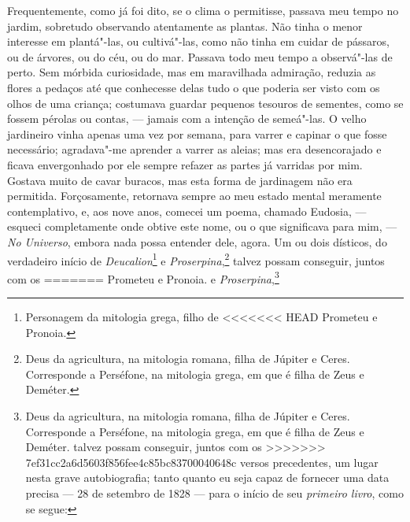 {{{{{{{{{{{{{{{{{%
Frequentemente, como já foi dito, se o clima o permitisse, passava
meu tempo no jardim, sobretudo observando atentamente as plantas. Não
tinha o menor interesse em plantá"-las, ou cultivá"-las, como não tinha em
cuidar de pássaros, ou de árvores, ou do céu, ou do mar. Passava todo
meu tempo a observá"-las de perto. Sem mórbida curiosidade, mas em
maravilhada admiração, reduzia as flores a pedaços até que conhecesse
delas tudo o que poderia ser visto com os olhos de uma criança;
costumava guardar pequenos tesouros de sementes, como se fossem pérolas
ou contas, --- jamais com a intenção de semeá"-las. O velho jardineiro
vinha apenas uma vez por semana, para varrer e capinar o que fosse
necessário; agradava"-me aprender a varrer as aleias; mas era
desencorajado e ficava envergonhado por ele sempre refazer as partes já
varridas por mim. Gostava muito de cavar buracos, mas esta forma de
jardinagem não era permitida. Forçosamente, retornava sempre ao meu
estado mental meramente contemplativo, e, aos nove anos, comecei um
poema, chamado Eudosia, --- esqueci completamente onde obtive este nome,
ou o que significava para mim, --- \textit{No Universo}, embora nada
possa entender dele, agora. Um ou dois dísticos, do verdadeiro início de
\textit{Deucalion}\footnote{Personagem da mitologia grega, filho de
<<<<<<< HEAD
  Prometeu e Pronoia.} e \textit{Proserpina},\footnote{Deus
  da agricultura, na mitologia romana, filha de Júpiter e Ceres.
  Corresponde a Perséfone, na mitologia grega, em que é filha de Zeus e
  Deméter.} talvez possam conseguir, juntos com os
=======
  Prometeu e Pronoia.  e \textit{Proserpina},\footnote{Deus
  da agricultura, na mitologia romana, filha de Júpiter e Ceres.
  Corresponde a Perséfone, na mitologia grega, em que é filha de Zeus e
  Deméter.  talvez possam conseguir, juntos com os
>>>>>>> 7ef31cc2a6d5603f856fee4c85bc83700040648c
versos precedentes, um lugar nesta grave autobiografia; tanto quanto eu
seja capaz de fornecer uma data precisa --- 28 de setembro de 1828 ---
para o início de seu \textit{primeiro livro}, como se segue: %

}}}}}}}}}}}}}}}}}}
